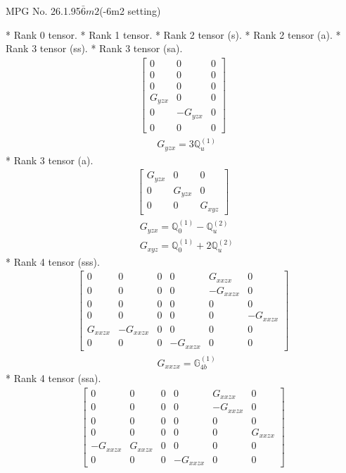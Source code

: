 \documentclass[fleqn,8pt,landscape]{jsarticle}
\begin{document}
\setcounter{MaxMatrixCols}{32}

\renewcommand{\tablename}{Table~}
\renewcommand{\figurename}{Figure~}
\begin{center}
\LARGE
MPG No. 26.1.95\quad$\bar{6}m2$\quad(-6m2 setting)
\end{center}
* Rank 0 tensor.
* Rank 1 tensor.
* Rank 2 tensor (s).
* Rank 2 tensor (a).
* Rank 3 tensor (ss).
* Rank 3 tensor (sa).
\begin{align*}
\begin{bmatrix} 0 & 0 & 0 \\ 0 & 0 & 0 \\ 0 & 0 & 0 \\ G_{yzx} & 0 & 0 \\ 0 & - G_{yzx} & 0 \\ 0 & 0 & 0 \end{bmatrix}
\end{align*}
\begin{align*}
& G_{yzx} = 3 \mathbb{Q}_{u}^{(1)}
\end{align*}
* Rank 3 tensor (a).
\begin{align*}
\begin{bmatrix} G_{yzx} & 0 & 0 \\ 0 & G_{yzx} & 0 \\ 0 & 0 & G_{xyz} \end{bmatrix}
\end{align*}
\begin{align*}
& G_{yzx} = \mathbb{Q}_{0}^{(1)} - \mathbb{Q}_{u}^{(2)} \\
& G_{xyz} = \mathbb{Q}_{0}^{(1)} + 2 \mathbb{Q}_{u}^{(2)}
\end{align*}
* Rank 4 tensor (sss).
\begin{align*}
\begin{bmatrix} 0 & 0 & 0 & 0 & G_{xxzx} & 0 \\ 0 & 0 & 0 & 0 & - G_{xxzx} & 0 \\ 0 & 0 & 0 & 0 & 0 & 0 \\ 0 & 0 & 0 & 0 & 0 & - G_{xxzx} \\ G_{xxzx} & - G_{xxzx} & 0 & 0 & 0 & 0 \\ 0 & 0 & 0 & - G_{xxzx} & 0 & 0 \end{bmatrix}
\end{align*}
\begin{align*}
& G_{xxzx} = \mathbb{G}_{4b}^{(1)}
\end{align*}
* Rank 4 tensor (ssa).
\begin{align*}
\begin{bmatrix} 0 & 0 & 0 & 0 & G_{xxzx} & 0 \\ 0 & 0 & 0 & 0 & - G_{xxzx} & 0 \\ 0 & 0 & 0 & 0 & 0 & 0 \\ 0 & 0 & 0 & 0 & 0 & G_{xxzx} \\ - G_{xxzx} & G_{xxzx} & 0 & 0 & 0 & 0 \\ 0 & 0 & 0 & - G_{xxzx} & 0 & 0 \end{bmatrix}
\end{align*}
\end{document}
